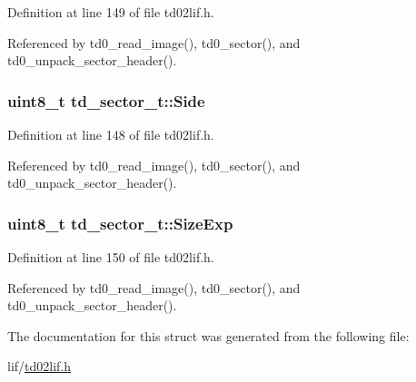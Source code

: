Definition at line 149 of file td02lif.\+h.



Referenced by td0\+\_\+read\+\_\+image(), td0\+\_\+sector(), and td0\+\_\+unpack\+\_\+sector\+\_\+header().

\subsubsection[{\texorpdfstring{Side}{Side}}]{\setlength{\rightskip}{0pt plus 5cm}uint8\+\_\+t td\+\_\+sector\+\_\+t\+::\+Side}\hypertarget{structtd__sector__t_ae8f05b8d6e903e618f6adec8973221f7}{}\label{structtd__sector__t_ae8f05b8d6e903e618f6adec8973221f7}


Definition at line 148 of file td02lif.\+h.



Referenced by td0\+\_\+read\+\_\+image(), td0\+\_\+sector(), and td0\+\_\+unpack\+\_\+sector\+\_\+header().

\subsubsection[{\texorpdfstring{Size\+Exp}{SizeExp}}]{\setlength{\rightskip}{0pt plus 5cm}uint8\+\_\+t td\+\_\+sector\+\_\+t\+::\+Size\+Exp}\hypertarget{structtd__sector__t_addc6d434740a76aebde544a9beab1b6b}{}\label{structtd__sector__t_addc6d434740a76aebde544a9beab1b6b}


Definition at line 150 of file td02lif.\+h.



Referenced by td0\+\_\+read\+\_\+image(), td0\+\_\+sector(), and td0\+\_\+unpack\+\_\+sector\+\_\+header().



The documentation for this struct was generated from the following file\+:\begin{DoxyCompactItemize}
\item 
lif/\hyperlink{td02lif_8h}{td02lif.\+h}\end{DoxyCompactItemize}
